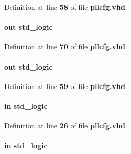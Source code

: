 Definition at line {\bf 58} of file {\bf pllcfg.\+vhd}.

\paragraph[{pllcfg\+\_\+vcodiv}]{ {\bfseries \textcolor{keywordflow}{out}\textcolor{vhdlchar}{ }} {\bfseries \textcolor{comment}{std\+\_\+logic}\textcolor{vhdlchar}{ }} \hspace{0.3cm}{\ttfamily [Port]}}\label{classpllcfg_a81fd7c6c4566951f6e0a52334667553f}


Definition at line {\bf 70} of file {\bf pllcfg.\+vhd}.

\paragraph[{pllrst\+\_\+start}]{ {\bfseries \textcolor{keywordflow}{out}\textcolor{vhdlchar}{ }} {\bfseries \textcolor{comment}{std\+\_\+logic}\textcolor{vhdlchar}{ }} \hspace{0.3cm}{\ttfamily [Port]}}\label{classpllcfg_a02d4fab598e9365250067526c1dbba0f}


Definition at line {\bf 59} of file {\bf pllcfg.\+vhd}.

\paragraph[{sclkA}]{ {\bfseries \textcolor{keywordflow}{in}\textcolor{vhdlchar}{ }} {\bfseries \textcolor{comment}{std\+\_\+logic}\textcolor{vhdlchar}{ }} \hspace{0.3cm}{\ttfamily [Port]}}\label{classpllcfg_a860f39249e7b7ffae5b85dcfacf1f055}


Definition at line {\bf 26} of file {\bf pllcfg.\+vhd}.

\paragraph[{sclkB}]{ {\bfseries \textcolor{keywordflow}{in}\textcolor{vhdlchar}{ }} {\bfseries \textcolor{comment}{std\+\_\+logic}\textcolor{vhdlchar}{ }} \hspace{0.3cm}{\ttfamily [Port]}}\label{classpllcfg_a3b671eb6d56f86d814015e6d4122ea7d}


